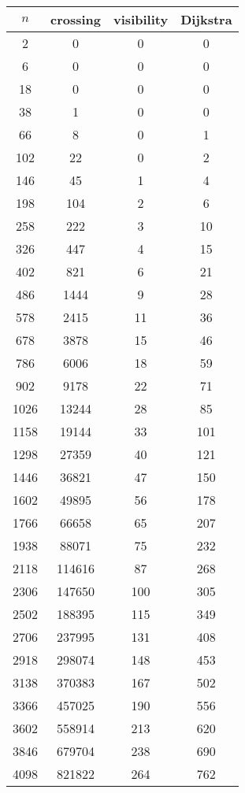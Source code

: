 \begin{table}[H]
\centering
\begin{tabular}{ |c|c|c|c| } 
 \hline
	$n$ & crossing & visibility & Dijkstra\\
	\hline
	2 & 0 & 0 & 0 \\
	\hline
	6 & 0 & 0 & 0 \\
	\hline
	18 & 0 & 0 & 0 \\
	\hline
	38 & 1 & 0 & 0 \\
	\hline
	66 & 8 & 0 & 1 \\
	\hline
	102 & 22 & 0 & 2 \\
	\hline
	146 & 45 & 1 & 4 \\
	\hline
	198 & 104 & 2 & 6 \\
	\hline
	258 & 222 & 3 & 10 \\
	\hline
	326 & 447 & 4 & 15 \\
	\hline
	402 & 821 & 6 & 21 \\
	\hline
	486 & 1444 & 9 & 28 \\
	\hline
	578 & 2415 & 11 & 36 \\
	\hline
	678 & 3878 & 15 & 46 \\
	\hline
	786 & 6006 & 18 & 59 \\
	\hline
	902 & 9178 & 22 & 71 \\
	\hline
	1026 & 13244 & 28 & 85 \\
	\hline
	1158 & 19144 & 33 & 101 \\
	\hline
	1298 & 27359 & 40 & 121 \\
	\hline
	1446 & 36821 & 47 & 150 \\
	\hline
	1602 & 49895 & 56 & 178 \\
	\hline
	1766 & 66658 & 65 & 207 \\
	\hline
	1938 & 88071 & 75 & 232 \\
	\hline
	2118 & 114616 & 87 & 268 \\
	\hline
	2306 & 147650 & 100 & 305 \\
	\hline
	2502 & 188395 & 115 & 349 \\
	\hline
	2706 & 237995 & 131 & 408 \\
	\hline
	2918 & 298074 & 148 & 453 \\
	\hline
	3138 & 370383 & 167 & 502 \\
	\hline
	3366 & 457025 & 190 & 556 \\
	\hline
3602 & 558914 & 213 & 620 \\
\hline
3846 & 679704 & 238 & 690 \\
\hline
4098 & 821822 & 264 & 762 \\

\end{tabular}
\end{table}
